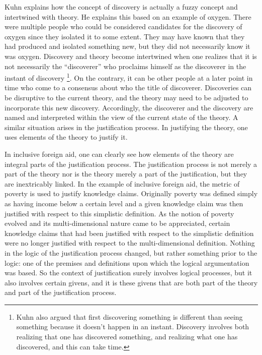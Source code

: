 \documentclass[a4paper]{article}
\begin{document}
Kuhn explains how the concept of discovery is actually a fuzzy concept and
intertwined with theory. He explains this based on an example of oxygen.
There were multiple people who could be considered candidates for the
discovery of oxygen since they isolated it to some extent. They may have known
that they had produced and isolated something new, but they did not
necessarily know it was oxygen. Discovery and theory become intertwined when
one realizes that it is not necessarily the ``discoverer'' who proclaims
himself as the discoverer in the instant of discovery
    \footnote{Kuhn also argued that first discovering something is different
        than seeing something because it doesn't happen in an instant.
        Discovery involves both realizing that one has discovered something,
        and realizing what one has discovered, and this can take time.}.
On the contrary, it can be other people at a later point in time who come to a
consensus about who the title of discoverer. Discoveries can be disruptive to
the current theory, and the theory may need to be adjusted to incorporate this
new discovery. Accordingly, the discoverer and the discovery are named and
interpreted within the view of the current state of the theory. A similar
situation arises in the justification process. In justifying the theory, one
uses elements of the theory to justify it.

In inclusive foreign aid, one can clearly see how elements of the theory are
integral parts of the justification process. The justification process is not
merely a part of the theory nor is the theory merely a part of the
justification, but they are inextricably linked. In the example of inclusive
foreign aid, the metric of poverty is used to justify knowledge claims.
Originally poverty was defined simply as having income below a certain level
and a given knowledge claim was then justified with respect to this simplistic
definition. As the notion of poverty evolved and its multi-dimensional nature
came to be appreciated, certain knowledge claims that had been justified with
respect to the simplistic definition were no longer justified with respect to
the multi-dimensional definition. Nothing in the logic of the justification
process changed, but rather something prior to the logic: one of the premises
and definitions upon which the logical argumentation was based. So the context
of justification surely involves logical processes, but it also involves
certain givens, and it is these givens that are both part of the theory and
part of the justification process.
\end{document}

